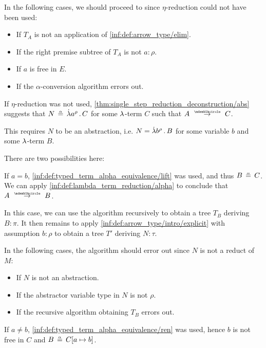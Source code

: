 \begin{algorithm}
\begin{thmenum}
\begin{thmenum}
      In the following cases, we should proceed to  since \( \eta \)-reduction could not have been used:
      \begin{itemize}
        \item If \( T_A \) is not an application of \ref{inf:def:arrow_type/elim}.
        \item If the right premise subtree of \( T_A \) is not \( a: \rho \).
        \item If \( a \) is free in \( E \).
        \item If the \( \alpha \)-conversion algorithm errors out.
      \end{itemize}

       If \( \eta \)-reduction was not used, \cref{thm:single_step_reduction_deconstruction/abs} suggests that \( N \aequiv \qabs {a^\rho} C \) for some \( {\mathrm \lambda} \)-term \( C \) such that \( A \pred C \).

      This requires \( N \) to be an abstraction, i.e. \( N = \qabs {b^\rho} B \) for some variable \( b \) and some \( {\mathrm \lambda} \)-term \( B \).

      There are two possibilities here:
      \begin{thmenum}
         If \( a = b \), \ref{inf:def:typed_term_alpha_equivalence/lift} was used, and thus \( B \aequiv C \). We can apply \ref{inf:def:lambda_term_reduction/alpha} to conclude that \( A \pred B \).

        In this case, we can use the algorithm recursively to obtain a tree \( T_B \) deriving \( B: \pi \). It then remains to apply \ref{inf:def:arrow_type/intro/explicit} with assumption \( b: \rho \) to obtain a tree \( T' \) deriving \( N: \tau \).

        In the following cases, the algorithm should error out since \( N \) is not a reduct of \( M \):
        \begin{itemize}
          \item If \( N \) is not an abstraction.
          \item If the abstractor variable type in \( N \) is not \( \rho \).
          \item If the recursive algorithm obtaining \( T_B \) errors out.
        \end{itemize}

         If \( a \neq b \), \ref{inf:def:typed_term_alpha_equivalence/ren} was used, hence \( b \) is not free in \( C \) and \( B \aequiv C[a \mapsto b] \).


\end{thmenum}
\end{thmenum}
\end{thmenum}
\end{algorithm}
